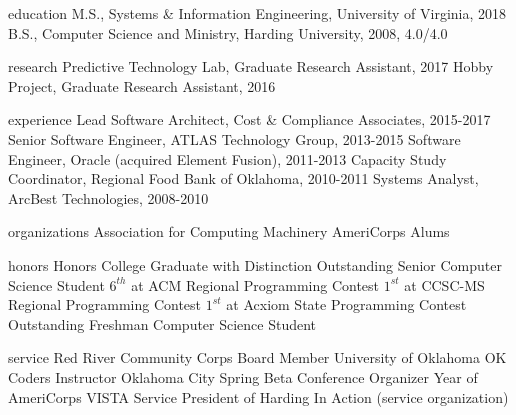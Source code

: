 \documentclass[11pt,article,oneside]{memoir}
\def\myname{Mark Rucker}
\begin{document}
	\noindent{\LARGE\scheader \textsc{\myname}}
	\bigskip

	\begin{cvsection}{education}
		\ind M.S., Systems \& Information Engineering, University of Virginia, 2018
		\ind B.S., Computer Science and Ministry, Harding University, 2008, 4.0/4.0
	\end{cvsection}

	\begin{cvsection}{research}		
		\ind Predictive Technology Lab, Graduate Research Assistant, 2017
		\ind Hobby Project, Graduate Research Assistant, 2016
	\end{cvsection}
	
	\begin{cvsection}{experience}
		\ind Lead Software Architect, Cost \& Compliance Associates, 2015-2017
		\ind Senior Software Engineer, ATLAS Technology Group, 2013-2015
		\ind Software Engineer, Oracle (acquired Element Fusion), 2011-2013
		\ind Capacity Study Coordinator, Regional Food Bank of Oklahoma, 2010-2011
		\ind Systems Analyst, ArcBest Technologies, 2008-2010
	\end{cvsection}
	
	\begin{cvsection}{organizations}
		\ind Association for Computing Machinery
		\ind AmeriCorps Alums
	\end{cvsection}
	
	\begin{cvsection}{honors}
		\ind Honors College Graduate with Distinction
		\ind Outstanding Senior Computer Science Student
		\ind $6^{th}$ at ACM Regional Programming Contest
		\ind $1^{st}$ at CCSC-MS Regional Programming Contest
		\ind $1^{st}$ at Acxiom State Programming Contest
		\ind Outstanding Freshman Computer Science Student
	\end{cvsection}

	\begin{cvsection}{service}
		\ind Red River Community Corps Board Member
		\ind University of Oklahoma OK Coders Instructor
		\ind Oklahoma City Spring Beta Conference Organizer
		\ind Year of AmeriCorps VISTA Service
		\ind President of Harding In Action (service organization)
	\end{cvsection}
\end{document}
